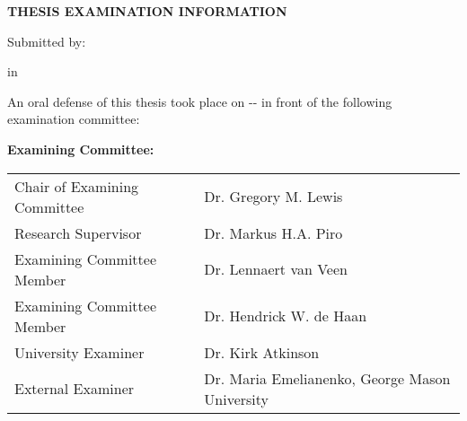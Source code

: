 
\cleardoublepage
\thispagestyle{plain}

\begin{center}
\textbf{THESIS EXAMINATION INFORMATION}

\bigskip

Submitted by:  \makeatletter\textbf{\@firstname\ {\@lastname}}\makeatother

\bigskip
\bigskip

\textbf{\degree} in \textbf{\program}

\end{center}


\bigskip
\bigskip

\noindent {}

\bigskip

An oral defense of this thesis took place on -\degreemonth-\degreeyear{} in front of the following examination committee:

\medskip

\noindent\textbf{Examining Committee:}

\medskip

\begingroup
\renewcommand{\arraystretch}{1.5}
\begin{tabular}{lcl}
    Chair of Examining Committee &\phantom{abc}& Dr. Gregory  M. Lewis\\
    Research Supervisor && Dr. Markus H.A. Piro\\
    Examining Committee Member && Dr. Lennaert van Veen \\
    Examining Committee Member && Dr. Hendrick W. de Haan \\
    University Examiner && Dr. Kirk Atkinson \\
    External Examiner && Dr. Maria Emelianenko, George Mason University\\
\end{tabular}
\endgroup

\medskip

